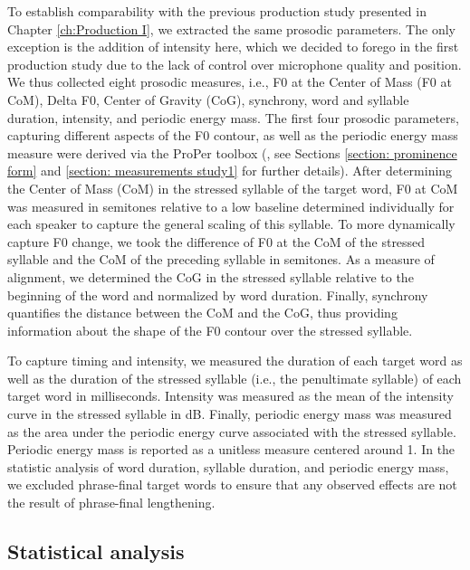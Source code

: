 To establish comparability with the previous production study presented in Chapter \ref{ch:Production I}, we extracted the same prosodic parameters. The only exception is the addition of intensity here, which we decided to forego in the first production study due to the lack of control over microphone quality and position. We thus collected eight prosodic measures, i.e., F0 at the Center of Mass (F0 at CoM), Delta F0, Center of Gravity (CoG), synchrony, word and syllable duration, intensity, and periodic energy mass. The first four prosodic parameters, capturing different aspects of the F0 contour, as well as the periodic energy mass measure were derived via the ProPer toolbox (\citealt{albertModelSonorityBased2023}, see Sections \ref{section: prominence form} and \ref{section: measurements study1} for further details). After determining the Center of Mass (CoM) in the stressed syllable of the target word, F0 at CoM  was measured in semitones relative to a low baseline determined individually for each speaker to capture the general scaling of this syllable. To more dynamically capture F0 change, we took the difference of F0 at the CoM of the stressed syllable and the CoM of the preceding syllable in semitones. As a measure of alignment, we determined the CoG in the stressed syllable relative to the beginning of the word and normalized by word duration. Finally, synchrony quantifies the distance between the CoM and the CoG, thus providing information about the shape of the F0 contour over the stressed syllable.

To capture timing and intensity, we measured the duration of each target word as well as the duration of the stressed syllable (i.e., the penultimate syllable) of each target word in milliseconds. Intensity was measured as the mean of the intensity curve in the stressed syllable in dB. Finally, periodic energy mass was measured as the area under the periodic energy curve associated with the stressed syllable. Periodic energy mass is reported as a unitless measure centered around 1. In the statistic analysis of word duration, syllable duration, and periodic energy mass, we excluded phrase-final target words to ensure that any observed effects are not the result of phrase-final lengthening.

\subsection{Statistical analysis} \label{sec:Production2 statistics}

